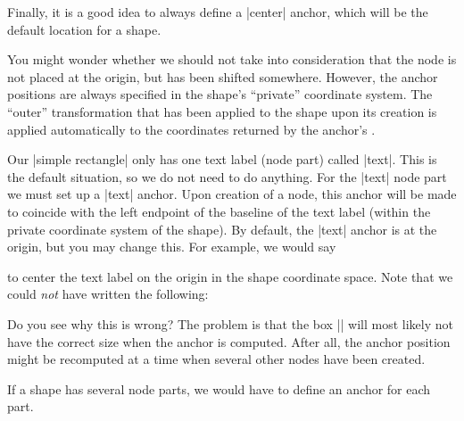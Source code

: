 \begin{command}{\pgfdeclareshape{}}
\begin{command}{\anchor{}}
        Finally, it is a good idea to always define a |center| anchor, which
        will be the default location for a shape.
\begin{codeexample}
\end{codeexample}

        You might wonder whether we should not take into consideration that the
        node is not placed at the origin, but has been shifted somewhere.
        However, the anchor positions are always specified in the shape's
        ``private'' coordinate system. The ``outer'' transformation that has
        been applied to the shape upon its creation is applied automatically to
        the coordinates returned by the anchor's .

        Our |simple rectangle| only has one text label (node part) called
        |text|. This is the default situation, so we do not need to do
        anything. For the |text| node part we must set up a |text| anchor. Upon
        creation of a node, this anchor will be made to coincide with the left
        endpoint of the baseline of the text label (within the private
        coordinate system of the shape). By default, the |text| anchor is at
        the origin, but you may change this. For example, we would say
\begin{codeexample}
\end{codeexample}
        to center the text label on the origin in the shape coordinate space.
        Note that we could \emph{not} have written the following:
\begin{codeexample}
\end{codeexample}
        Do you see why this is wrong? The problem is that the box
        |\pgfnodeparttextbox| will most likely not have the correct size when
        the anchor is computed. After all, the anchor position might be
        recomputed at a time when several other nodes have been created.

        If a shape has several node parts, we would have to define an anchor
        for each part.
  \end{command}


\end{command}
